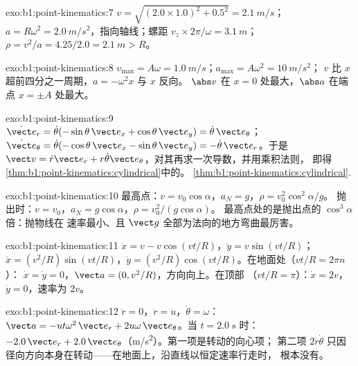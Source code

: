 \begin{solution}{exo:b1:point-kinematics:7}
$v = \sqrt{(2.0 \times 1.0)^2 + 0.5^2} = \qty{2.1}{m/s}$；$a = R\omega^2 =
\qty{2.0}{m/s^2}$，指向轴线；螺距 $v_z \times 2\pi/\omega =
\qty{3.1}{m}$；$\rho = v^2/a = 4.25/2.0 = \qty{2.1}{m} > R$。
\end{solution}

\begin{solution}{exo:b1:point-kinematics:8}
$v_{\max} = A\omega = \qty{1.0}{m/s}$；$a_{\max} = A\omega^2 = \qty{10}{m/s^2}$；
$v$ 比 $x$ 超前四分之一周期，$a = -\omega^2x$ 与 $x$ 反向。
$\abs v$ 在 $x = 0$ 处最大，$\abs a$ 在端点 $x = \pm A$ 处最大。
\end{solution}

\begin{solution}{exo:b1:point-kinematics:9}
$\dot{\vect e}_r = \dot\theta(-\sin\theta\,\vect e_x + \cos\theta\,\vect e_y)
= \dot\theta\,\vect e_\theta$；$\dot{\vect e}_\theta = \dot\theta(-\cos\theta\,
\vect e_x - \sin\theta\,\vect e_y) = -\dot\theta\,\vect e_r$。于是
$\vect v = \dot r\vect e_r + r\dot\theta\vect e_\theta$，对其再求一次导数，并用乘积法则，
即得\cref{thm:b1:point-kinematics:cylindrical}中的。
\cref{thm:b1:point-kinematics:cylindrical}.
\end{solution}

\begin{solution}{exo:b1:point-kinematics:10}
最高点：$v = v_0\cos\alpha$，$a_N = g$，$\rho = v_0^2\cos^2\alpha/g$。
抛出时：$v = v_0$，$a_N = g\cos\alpha$，$\rho = v_0^2/(g\cos\alpha)$。
最高点处的是抛出点的 $\cos^3\alpha$ 倍：抛物线在
速率最小、且 $\vect g$ 全部为法向的地方弯曲最厉害。
\end{solution}

\begin{solution}{exo:b1:point-kinematics:11}
$\dot x = v - v\cos(vt/R)$，$\dot y = v\sin(vt/R)$；$\ddot x = (v^2/R)
\sin(vt/R)$，$\ddot y = (v^2/R)\cos(vt/R)$。在地面处（$vt/R = 2\pi n$）：
$\dot x = \dot y = 0$，$\vect a = (0, v^2/R)$，方向向上。在顶部
（$vt/R = \pi$）：$\dot x = 2v$，$\dot y = 0$，速率为 $2v$。
\end{solution}

\begin{solution}{exo:b1:point-kinematics:12}
$\ddot r = 0$，$\dot r = u$，$\dot\theta = \omega$：$\vect a = -ut\omega^2\,
\vect e_r + 2u\omega\,\vect e_\theta$。当 $t = \qty{2.0}{s}$ 时：$-2.0\,\vect e_r
+ 2.0\,\vect e_\theta$（\unit{m/s^2}）。第一项是转动的向心项；
第二项 $2\dot r\dot\theta$ 只因
径向方向本身在转动——在地面上，沿直线以恒定速率行走时，
根本没有。
\end{solution}

